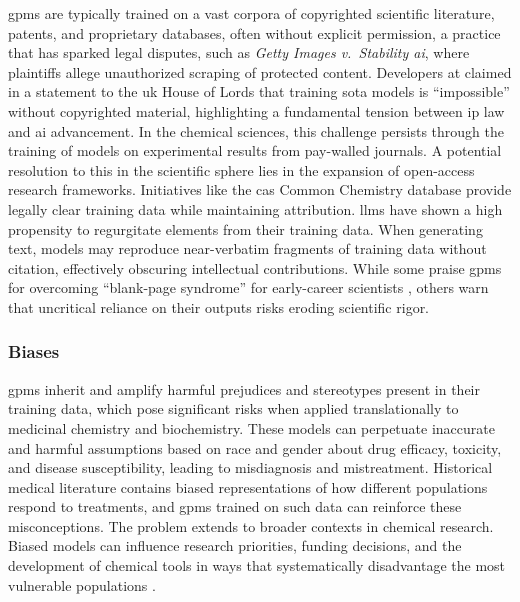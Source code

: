 \glspl{gpm} are typically trained on a vast corpora of copyrighted scientific literature, patents, and proprietary databases, often without explicit permission, a practice that has sparked legal disputes, such as \textit{Getty Images v.\ Stability \gls{ai}}, where plaintiffs allege unauthorized scraping of protected content. \autocite{kirchhubel2024intellectual} Developers at  claimed in a statement to the \gls{uk} House of Lords that training \gls{sota} models is \enquote{impossible} without copyrighted material, highlighting a fundamental tension between \gls{ip} law and \gls{ai} advancement. \autocite{openai2023written} 
In the chemical sciences, this challenge persists through the training of models on experimental results from pay-walled journals. 
A potential resolution to this in the scientific sphere lies in the expansion of open-access research frameworks. 
Initiatives like the \gls{cas} Common Chemistry database provide legally clear training data while maintaining attribution.
\glspl{llm} have shown a high propensity to regurgitate elements from their training data. 
When generating text, models may reproduce near-verbatim fragments of training data without citation, effectively obscuring intellectual contributions.\autocite{bender2021dangers} 
While some praise \glspl{gpm} for overcoming \enquote{blank-page syndrome} for early-career scientists \autocite{altmae2023artificial}, others warn that uncritical reliance on their outputs risks eroding scientific rigor.\autocite{donker2023dangers}


\subsubsection{Biases}

\glspl{gpm} inherit and amplify harmful prejudices and stereotypes present in their training data, which pose significant risks when applied translationally to medicinal chemistry and biochemistry. \autocite{spotte-smith2025considering, yang2024demographic, omiye2023large} 
These models can perpetuate inaccurate and harmful assumptions based on race and gender about drug efficacy, toxicity, and disease susceptibility, leading to misdiagnosis and mistreatment. \autocite{chen2023algorithmic} 
Historical medical literature contains biased representations of how different populations respond to treatments, and \glspl{gpm} trained on such data can reinforce these misconceptions. \autocite{mittermaier2023bias}
The problem extends to broader contexts in chemical research. 
Biased models can influence research priorities, funding decisions, and the development of chemical tools in ways that systematically disadvantage the most vulnerable populations \autocite{dotan2019value0laden}. 

